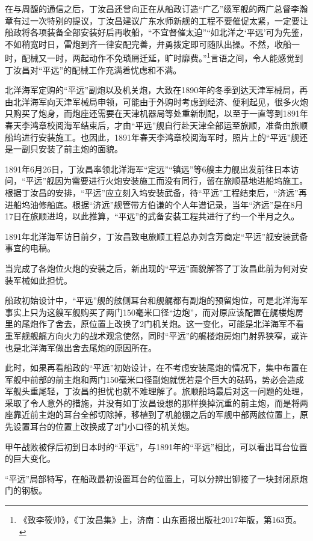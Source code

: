 \documentclass[12pt,UTF8]{ctexbook}
\begin{document}
在与周馥的通信之后，丁汝昌还曾向正在从船政订造“广乙”级军舰的两广总督李瀚章有过一次特别的提议，丁汝昌建议广东水师新舰的工程不要催促太紧，一定要让船政将各项装备全部安装好后再收船，“不宜督催太迫”“如北洋之‘平远’可为先鉴，不如稍宽时日，雷炮到齐一律安配完善，弁勇拨定即可随队出操。不然，收船一时，配械又一时，两起动作不免琐屑迁延，旷时靡费。”\footnote{《致李筱帅》，《丁汝昌集》上，济南：山东画报出版社2017年版，第163页。}言语之间，令人能感觉到丁汝昌对“平远”的配械工作充满着忧虑和不满。

北洋海军定购的“平远”副炮以及机关炮，大致在1890年的冬季到达天津军械局，再由北洋海军向天津军械局申领，可能由于外购时考虑到经济、便利起见，很多火炮只购买了炮身，而炮座还需要在天津机器局等处重新制配，以至于一直等到1891年春天李鸿章校阅海军结束后，才由“平远”舰自行赴天津全部运至旅顺，准备由旅顺船坞进行安装施工。也因此，1891年春天李鸿章校阅海军时，照片上的“平远”舰还是一副只安装了前主炮的面貌。

1891年6月26日，丁汝昌率领北洋海军“定远”“镇远”等6艘主力舰出发前往日本访问，“平远”舰因为需要进行火炮安装施工而没有同行，留在旅顺基地进船坞施工。根据丁汝昌的安排，“平远”应立刻入坞安装武备，待“平远”工程结束后，“济远”再进船坞油修船底。根据“济远”舰管带方伯谦的个人年谱记录，当年“济远”是在8月17日在旅顺进坞，以此推算，“平远”的武备安装工程共进行了约一个半月之久。

1891年北洋海军访日前夕，丁汝昌致电旅顺工程总办刘含芳商定“平远”舰安装武备事宜的电稿。

当完成了各炮位火炮的安装之后，新出现的“平远”面貌解答了丁汝昌此前为何对安装军械如此担忧。

船政初始设计中，“平远”舰的舷侧耳台和舰艉都有副炮的预留炮位，可是北洋海军事实上只为这艘军舰购买了两门150毫米口径“边炮”，而对原应该配置在艉楼炮房里的尾炮作了舍去，原位置上改换了2门机关炮。这一变化，可能是北洋海军不看重军舰舰艉方向火力的战术观念使然，同时“平远”的艉楼炮房炮门射界狭窄，或许也是北洋海军做出舍去尾炮的原因所在。

此时，如果再看船政的“平远”初始设计，在不考虑安装尾炮的情况下，集中布置在军舰中前部的前主炮和两门150毫米口径副炮就恍若是个巨大的砝码，势必会造成军舰头重尾轻，丁汝昌的担忧也就不难理解了。旅顺船坞最后对这一问题的处理，采取了令人意外的措施，并没有如丁汝昌设想的那样换掉沉重的前主炮，而是将两座靠近前主炮的耳台全部切除掉，移植到了机舱棚之后的军舰中部两舷位置上，原先设置耳台的位置上改换成了2门小口径的机关炮。

甲午战败被俘后初到日本时的“平远”，与1891年的“平远”相比，可以看出耳台位置的巨大变化。

“平远”局部特写，在船政最初设置耳台的位置上，可以分辨出铆接了一块封闭原炮门的钢板。
\end{document}
